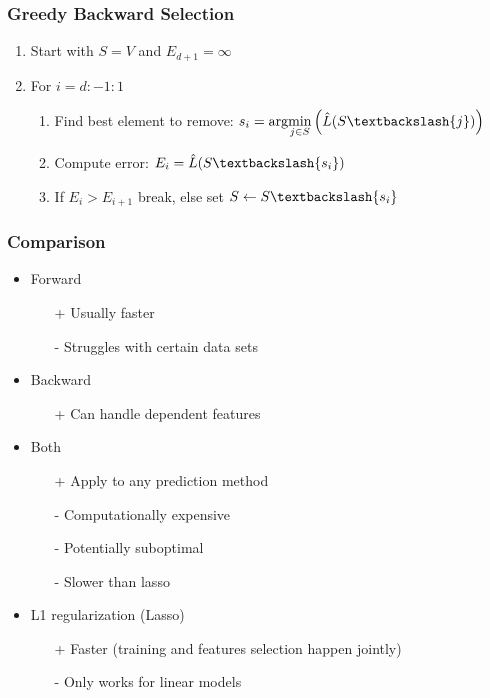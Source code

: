\documentclass[8pt,a4paper]{scrartcl}
\newcommand{\Argmin}[2]{\text{arg}\underset{#1}{\min}\left(#2\right)}
\begin{document}
\begin{multicols*}{3}
\subsubsection{Greedy Backward Selection}

\begin{enumerate}
\ncompaq
\item Start with $S=V$ and $E_{d+1}=\infty$
\item For $i=d:-1:1$
\begin{enumerate}
\ncompaq
\item Find best element to remove: $s_i=\Argmin{j\in S}{\hat{L}(S\textbackslash\{j\})}$
\item Compute error: $E_i=\hat{L}(S\textbackslash\{s_i\})$
\item If $E_i>E_{i+1}$ break, else set $S\leftarrow S\textbackslash \{s_i\}$
\end{enumerate}
\end{enumerate}

\subsubsection{Comparison}

\begin{itemize}
\ncompaq
\item Forward
\begin{itemize}
\ncompaq
\item[+] Usually faster
\item[-] Struggles with certain data sets
\end{itemize}
\item Backward
\begin{itemize}
\ncompaq
\item[+] Can handle dependent features
\end{itemize}
\item Both
\begin{itemize}
\ncompaq
\item[+] Apply to any prediction method
\item[-] Computationally expensive
\item[-] Potentially suboptimal
\item[-] Slower than lasso
\end{itemize}
\item L1 regularization (Lasso)
\begin{itemize}
\ncompaq
\item[+] Faster (training and features selection happen jointly)
\item[-] Only works for linear models
\end{itemize}
\end{itemize}


\end{multicols*}
\end{document}
